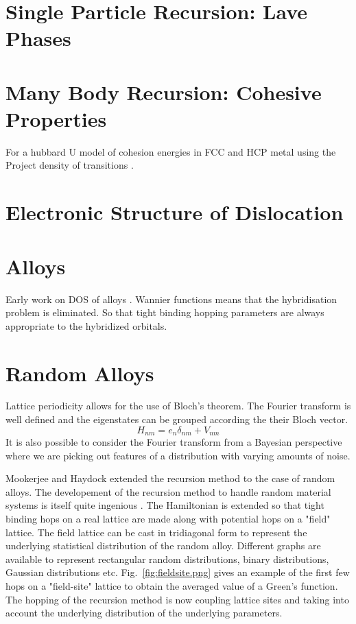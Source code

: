 \section{Single Particle Recursion: Lave Phases}

\section{Many Body Recursion: Cohesive Properties}
For a hubbard U model of cohesion energies in FCC and HCP metal using the Project density of transitions
\cite{haydock14}.

\section{Electronic Structure of Dislocation}
\cite{paidar81}

\section{Alloys}
Early work on DOS of alloys \cite{cubiotti77}. 
Wannier functions means that the hybridisation problem is eliminated. 
So that tight binding hopping parameters are always appropriate to the
hybridized orbitals.

\section{Random Alloys}
Lattice periodicity allows for the use of Bloch's theorem. The Fourier transform
is well defined and the eigenstates can be grouped according the their Bloch vector.
%
\begin{equation}
H_{nm} = e_{n}\delta_{nm} + V_{nm}
\end{equation}
%
It is also possible to consider the Fourier transform from a Bayesian perspective
where we are picking out features of a distribution with varying amounts of noise.

Mookerjee and Haydock extended the recursion method to the case of random alloys.
The developement of the recursion method to handle random material systems is 
itself quite ingenious \cite{mookerjee , haydock74}. The Hamiltonian is extended
so that tight binding hops on a real lattice are made along with potential hops
on a "field" lattice. The field lattice can be cast in tridiagonal form to represent
the underlying statistical distribution of the random alloy. Different graphs are available
to represent rectangular random distributions, binary distributions, Gaussian distributions
etc. Fig.~\ref{fig:fieldsite.png} gives an example of the first few hops on a "field-site" 
lattice to obtain the averaged value of a Green's function. The hopping of the recursion method
is now coupling lattice sites and taking into account the underlying distribution of 
the underlying parameters.

